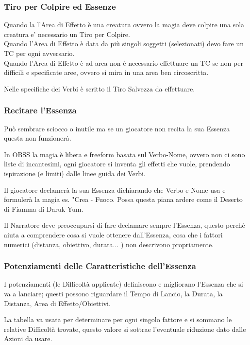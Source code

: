 \documentclass[a4paper,twoside,openany]{book}
\begin{document}
\begin{multicols}{2}
\subsubsection{Tiro per Colpire ed Essenze}

Quando la l'Area di Effetto è una creatura ovvero la magia deve colpire una sola creatura e' necessario un Tiro per Colpire.\\
Quando l'Area di Effetto è data da più singoli soggetti (selezionati) devo fare un TC per ogni avversario.\\
Quando l'Area di Effetto è ad area non è necessario effettuare un TC se non per difficili e specificate aree, ovvero si mira in una area ben circoscritta.

Nelle specifiche dei Verbi è scritto il Tiro Salvezza da effettuare.

\subsubsection{Recitare l'Essenza}

\label{recitare-lessenza}

Può sembrare sciocco o inutile ma se un giocatore non recita la sua Essenza questa non funzionerà.

In OBSS la magia è libera e freeform basata sul Verbo-Nome, ovvero non ci sono liste di incantesimi, ogni giocatore si inventa gli effetti che vuole, prendendo ispirazione (e limiti) dalle linee guida dei Verbi.

Il giocatore declamerà la sua Essenza dichiarando che Verbo e Nome usa e formulerà la magia es. "Crea - Fuoco. Possa questa piana ardere come il Deserto di Fiamma di Daruk-Yum.

Il Narratore deve preoccuparsi di fare declamare sempre l'Essenza, questo perché aiuta a comprendere cosa si vuole ottenere dall'Essenza, cosa che i fattori numerici (distanza, obiettivo, durata... ) non descrivono propriamente.

\subsubsection{Potenziamenti delle Caratteristiche dell'Essenza}

\label{potenziamenti-delle-caratteristiche-dellessenza}

I potenziamenti (le Difficoltà applicate) definiscono e migliorano l'Essenza che si va a lanciare; questi possono riguardare il Tempo di Lancio, la Durata, la Distanza, Area di Effetto/Obiettivi.

La tabella va usata per determinare per ogni singolo fattore e si sommano le relative Difficoltà trovate, questo valore si sottrae l'eventuale riduzione dato dalle Azioni da usare.

\end{multicols}
\end{document}
